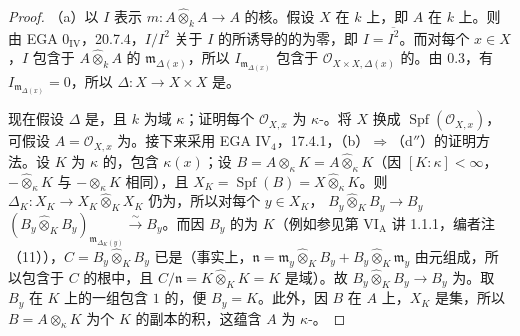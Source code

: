 \begin{proof}
（a）以 $I$ 表示 $m:A\widehat\otimes_k A\to A$ 的核。假设 $X$ 在 $k$ 上，即 $A$ 在 $k$ 上。则由 EGA $0_{\mathrm{IV}}$，20.7.4，$I/I^2$ 关于 $I$ 的所诱导的的为零，即 $I=\overline{I^2}$。而对每个 $x\in X$，$I$ 包含于 $A\widehat\otimes_k A$ 的 $\mathfrak m_{\Delta(x)}$，所以 $I_{\mathfrak m_{\Delta(x)}}$ 包含于 $\mathcal O_{X\times X,\Delta(x)}$ 的。由  0.3，有 $I_{\mathfrak m_{\Delta(x)}}=0$，所以 $\Delta:X\to X\times X$ 是。

现在假设 $\Delta$ 是，且 $k$ 为域 $\kappa$；证明每个 $\mathcal O_{X,x}$ 为 $\kappa$-。将 $X$ 换成 $\operatorname{Spf}(\mathcal O_{X,x})$，可假设 $A=\mathcal O_{X,x}$ 为。接下来采用 EGA IV$_4$，17.4.1，（b）$\Rightarrow$（d$''$）的证明方法。设 $K$ 为 $\kappa$ 的，包含 $\kappa(x)$；设 $B=A\otimes_\kappa K=A\widehat\otimes_\kappa K$（因 $[K:\kappa]<\infty$，$-\widehat\otimes_\kappa K$ 与 $-\otimes_\kappa K$ 相同），且 $X_K=\operatorname{Spf}(B)=X\widehat\otimes_\kappa K$。则 $\Delta_K:X_K\to X_K\widehat\otimes_K X_K$ 仍为，所以对每个 $y\in X_K$， $B_y\widehat\otimes_K B_y\to B_y$  $(B_y\widehat\otimes_K B_y)_{\mathfrak m_{\Delta_K(y)}}\xrightarrow{\sim}B_y$。而因 $B_y$ 的为 $K$（例如参见第 VI$_{\mathrm A}$ 讲 1.1.1，编者注（11）），$C=B_y\widehat\otimes_K B_y$ 已是（事实上，$\mathfrak n=\mathfrak m_y\widehat\otimes_K B_y+B_y\widehat\otimes_K\mathfrak m_y$ 由元组成，所以包含于 $C$ 的根中，且 $C/\mathfrak n=K\widehat\otimes_K K=K$ 是域）。故
$B_y\widehat\otimes_K B_y\to B_y$ 为。取 $B_y$ 在 $K$ 上的一组包含 $1$ 的，便 $B_y=K$。此外，因 $B$ 在 $A$ 上，$X_K$ 是集，所以 $B=A\otimes_\kappa K$ 为个 $K$ 的副本的积，这蕴含 $A$ 为 $\kappa$-。


\end{proof}
